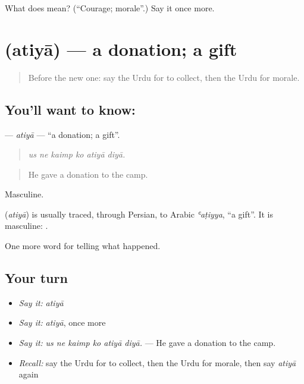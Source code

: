 \begin{tcolorbox}[breakable,colback=teal!4,colframe=teal!35!black,title={Before you move on}]
What does  mean? (\textquotedblleft{}Courage; morale\textquotedblright{}.) Say it once more.
\end{tcolorbox}
\section[\texorpdfstring{\ur{عطیہ} (atiyā)}{عطیہ (atiyā)}]{ (atiyā) — a donation; a gift}

\label{lesson:UR-C299-atiya}



\begin{quote}
Before the new one: say the Urdu for to collect, then the Urdu for morale.
\end{quote}

\subsection*{You'll want to know: }
\textbf{} — \emph{atiyā} — \textquotedblleft{}a donation; a gift\textquotedblright{}.

\begin{quote}
     
\end{quote}

\begin{quote}
\emph{us ne kaimp ko atiyā diyā.}
\end{quote}

\begin{quote}
He gave a donation to the camp.
\end{quote}

Masculine.

\begin{cousinweb}
\textbf{} (\emph{atiyā}) is usually traced, through Persian, to Arabic \emph{ʿaṭiyya}, \textquotedblleft{}a gift\textquotedblright{}. It is masculine: \textbf{ }.
\end{cousinweb}

\begin{grammarlens}[title={What you've built}]
One more word for telling what happened.
\end{grammarlens}

\subsection*{Your turn}
\begin{itemize}
\raggedright
  \item \emph{Say it:} \emph{atiyā}
  \item \emph{Say it:} \emph{atiyā}, once more
  \item \emph{Say it:} \emph{us ne kaimp ko atiyā diyā.} — He gave a donation to the camp.
  \item \emph{Recall:} say the Urdu for to collect, then the Urdu for morale, then say \emph{atiyā} again
\end{itemize}

